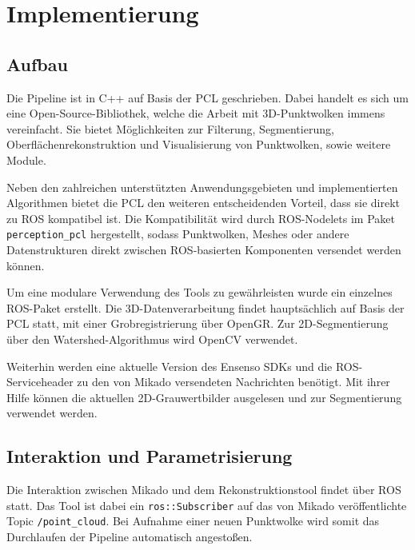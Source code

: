 
\chapter{Implementierung}
\label{ch:implementierung}


\section{Aufbau}
\label{sec:aufbau}

Die Pipeline ist in C++ auf Basis der \ac{PCL} \cite{rusu2011pcl} geschrieben.
Dabei handelt es sich um eine Open-Source-Bibliothek, welche die Arbeit mit 3D-Punktwolken immens vereinfacht.
Sie bietet Möglichkeiten zur Filterung, Segmentierung, Oberflächenrekonstruktion und Visualisierung von Punktwolken, sowie weitere Module.

Neben den zahlreichen unterstützten Anwendungsgebieten und implementierten Algorithmen bietet die \ac{PCL} den weiteren entscheidenden Vorteil, dass sie direkt zu \ac{ROS} kompatibel ist.
Die Kompatibilität wird durch ROS-Nodelets im Paket \texttt{perception\_pcl} hergestellt, sodass Punktwolken, Meshes oder andere Datenstrukturen direkt zwischen \ac{ROS}-basierten Komponenten versendet werden können.

Um eine modulare Verwendung des Tools zu gewährleisten wurde ein einzelnes \ac{ROS}-Paket erstellt.
Die 3D-Datenverarbeitung findet hauptsächlich auf Basis der \ac{PCL} statt, mit einer Grobregistrierung über \ac{OpenGR}.
Zur 2D-Segmentierung über den Watershed-Algorithmus wird OpenCV verwendet.

Weiterhin werden eine aktuelle Version des Ensenso SDKs und die \ac{ROS}-Serviceheader zu den von Mikado versendeten Nachrichten benötigt.
Mit ihrer Hilfe können die aktuellen 2D-Grauwertbilder ausgelesen und zur Segmentierung verwendet werden.


\section{Interaktion und Parametrisierung}
\label{sec:interaktion}

Die Interaktion zwischen Mikado und dem Rekonstruktionstool findet über \ac{ROS} statt.
Das Tool ist dabei ein \texttt{ros::Subscriber} auf das von Mikado veröffentlichte Topic \texttt{/point\_cloud}.
Bei Aufnahme einer neuen Punktwolke wird somit das Durchlaufen der Pipeline automatisch angestoßen.


